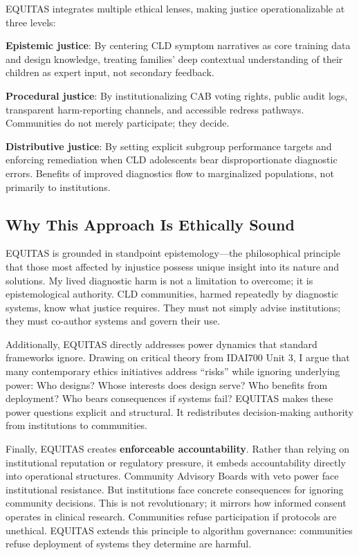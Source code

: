 \documentclass[12pt,a4paper]{article}
\begin{document}
EQUITAS integrates multiple ethical lenses, making justice operationalizable at three levels:

\textbf{Epistemic justice}: By centering CLD symptom narratives as core training data and design knowledge, treating families' deep contextual understanding of their children as expert input, not secondary feedback.

\textbf{Procedural justice}: By institutionalizing CAB voting rights, public audit logs, transparent harm-reporting channels, and accessible redress pathways. Communities do not merely participate; they decide.

\textbf{Distributive justice}: By setting explicit subgroup performance targets and enforcing remediation when CLD adolescents bear disproportionate diagnostic errors. Benefits of improved diagnostics flow to marginalized populations, not primarily to institutions.

\subsection{Why This Approach Is Ethically Sound}

EQUITAS is grounded in standpoint epistemology---the philosophical principle that those most affected by injustice possess unique insight into its nature and solutions. My lived diagnostic harm is not a limitation to overcome; it is epistemological authority. CLD communities, harmed repeatedly by diagnostic systems, know what justice requires. They must not simply advise institutions; they must co-author systems and govern their use.

Additionally, EQUITAS directly addresses power dynamics that standard frameworks ignore. Drawing on critical theory from IDAI700 Unit 3, I argue that many contemporary ethics initiatives address ``risks'' while ignoring underlying power: Who designs? Whose interests does design serve? Who benefits from deployment? Who bears consequences if systems fail? EQUITAS makes these power questions explicit and structural. It redistributes decision-making authority from institutions to communities.

Finally, EQUITAS creates \textbf{enforceable accountability}. Rather than relying on institutional reputation or regulatory pressure, it embeds accountability directly into operational structures. Community Advisory Boards with veto power face institutional resistance. But institutions face concrete consequences for ignoring community decisions. This is not revolutionary; it mirrors how informed consent operates in clinical research. Communities refuse participation if protocols are unethical. EQUITAS extends this principle to algorithm governance: communities refuse deployment of systems they determine are harmful.
\end{document}
